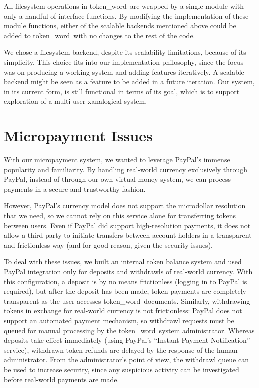 \documentclass{acm_proc_article-sp}
\newcommand{\tokenWord}{token\_word}
\begin{document}
All filesystem operations in \tokenWord \  are wrapped by a single module with only a handful of interface functions.
By modifying the implementation of these module functions, either of the scalable backends mentioned above could be added to \tokenWord \  with no changes to the rest of the code. 

We chose a filesystem backend, despite its scalability limitations, because of its simplicity.
This choice fits into our implementation philosophy, since the focus was on producing a working system and adding features iteratively.
A scalable backend might be seen as a feature to be added in a future iteration.
Our system, in its current form, is still functional in terms of its goal, which is to support exploration of a multi-user xanalogical system.





\section{Micropayment Issues}
With our micropayment system, we wanted to leverage PayPal's \cite{paypal} immense popularity and familiarity.
By handling real-world currency exclusively through PayPal, instead of through our own virtual money system, we can process payments in a secure and trustworthy fashion.

However, PayPal's currency model does not support the microdollar resolution that we need, so we cannot rely on this service alone for transferring tokens between users.
Even if PayPal did support high-resolution payments, it does not allow a third party to initiate transfers between account holders in a transparent and frictionless way (and for good reason, given the security issues).

To deal with these issues, we built an internal token balance system and used PayPal integration only for deposits and withdrawls of real-world currency.
With this configuration, a deposit is by no means frictionless (logging in to PayPal is required), but after the deposit has been made, token payments are completely transparent as the user accesses \tokenWord \  documents.
Similarly, withdrawing tokens in exchange for real-world currency is not frictionless: 
PayPal does not support an automated payment mechanism, so withdrawl requests must be queued for manual processing by the \tokenWord \  system administrator.
Whereas deposits take effect immediately (using PayPal's ``Instant Payment Notification'' service), withdrawn token refunds are delayed by the response of the human administrator.
From the administrator's point of view, the withdrawl queue can be used to increase security, since any suspicious activity can be investigated before real-world payments are made.  
\end{document}
